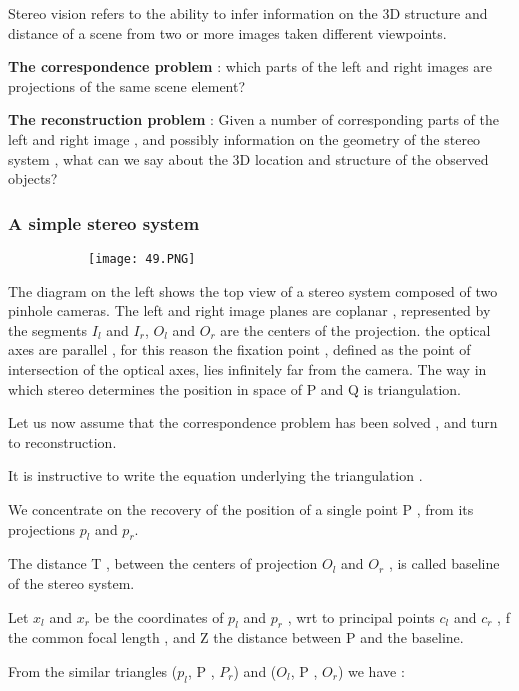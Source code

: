 \documentclass{article}
\begin{document}
Stereo vision refers to the ability to infer information on the 3D structure and distance of a scene from two or more images taken different viewpoints.

\textbf{The correspondence problem} : which parts of the left and right images are projections of the same scene element?

\textbf{The reconstruction problem} : Given a number of corresponding parts of the left and right image , and possibly information on the geometry of the stereo system , what can we say about the 3D location and structure of the observed objects?



\subsubsection{A simple stereo system}

\begin{figure}[ht!]
  \centering
  \begin{subfigure}[b]{0.8\linewidth}
    \texttt{[image: 49.PNG]}
  \end{subfigure}
\end{figure}

The diagram on the left shows the top view of a stereo system composed of two pinhole cameras. The left and right image planes are coplanar , represented by the segments $I_l$ and $I_r$, $O_l$ and $O_r$ are the centers of the projection. the optical axes are parallel , for this reason the fixation point , defined as the point of intersection of the optical axes, lies infinitely far from the camera. The way in which stereo determines the position in space of P and Q is triangulation.

Let us now assume that the correspondence problem has been solved , and turn to reconstruction.

It is instructive to write the equation underlying the triangulation .

We concentrate on the recovery of the position of a single point P , from its projections $p_l$ and $p_r$.

The distance T , between the centers of projection $O_l$ and $O_r$ , is called baseline of the stereo system.

Let $x_l$ and $x_r$ be the coordinates of $p_l$ and $p_r$ , wrt to principal points $c_l$ and $c_r$ , f the common focal length , and Z the distance between P and the baseline.

From the similar triangles ($p_l$, P , $P_r$) and ($O_l$, P , $O_r$) we have :
\end{document}
